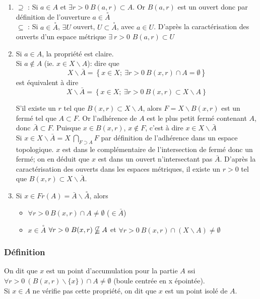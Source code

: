 \documentclass[a4paper, oneside]{report}
\newcommand{\cerc}[1]{\overset{\circ}{#1}}
\begin{document}
\begin{enumerate}
\item $\supseteq$ : Si $a\in A$ et $\exists r>0~B(a,r)\subset A$. Or $B(a,r)$ est un ouvert donc par définition de l'ouverture $a\in \cerc{A}$\\
$\subseteq$ : Si $a\in \cerc{A}$, $\exists U$ ouvert, $U\subset \cerc{A}$, avec $a\in U$. D'après la caractérisation des ouverts d'un espace métrique $\exists~r>0$ $B(a,r)\subset U$

\item Si $a\in A$, la propriété est claire.\\
  Si $a\notin A$ (ie. $x \in X\backslash A$):
  dire que 
  $$X\backslash \bar{A} = \left\{x\in X;~\exists r>0~ B(x,r) \cap A = \emptyset \right\}$$
  est équivalent à dire
  $$X\backslash \bar{A} = \left\{x\in X;~\exists r>0~ B(x,r) \subset X\backslash A \right\}$$
  
  S'il existe un $r$ tel que $B(x,r)\subset X\backslash A$, alors $F=X\backslash B(x,r)$ est un fermé tel que $A\subset F$. Or l'adhérence de $A$ est le plus petit fermé contenant $A$, donc $\bar{A}\subset F$. Puisque $x\in B(x, r)$, $x\notin F$, c'est à dire $x\in X\backslash \bar{A}$\\
  Si $x\in X\backslash \bar{A}=X\ \bigcap_{F\supset A}F$ par définition de l'adhérence dans un espace topologique. $x$ est dans le complémentaire de l'intersection de fermé donc un fermé; on en déduit que $x$ est dans un ouvert n'intersectant pas $\bar{A}$. D'après la caractérisation des ouverts dans les espaces métriques, il existe un $r>0$ tel que  $B(x, r) \subset X\backslash \bar{A}$.\\
  
\item Si $x\in Fr(A)=\bar{A} \backslash \cerc{A}$, alors 
\begin{itemize}
\item  $\forall r>0~B(x,r)\cap A \neq \emptyset$ ($\in \bar{A}$)
\item $x\in \cerc{A}$ $\forall r>0~B(x,r)\nsubseteqq A$ et $\forall r>0~B(x,r)\cap (X\backslash A)\neq \emptyset$
\end{itemize}

\end{enumerate}

\subsubsection{Définition}
On dit que $x$ est un point d'accumulation pour la partie $A$ ssi $\forall r>0~(B(x,r)\backslash \{x\}) \cap A \neq \emptyset$ (boule centrée en x épointée).\\
Si $x\in A$ ne vérifie pas cette propriété, on dit que $x$ est un point isolé de $A$.
\end{document}
